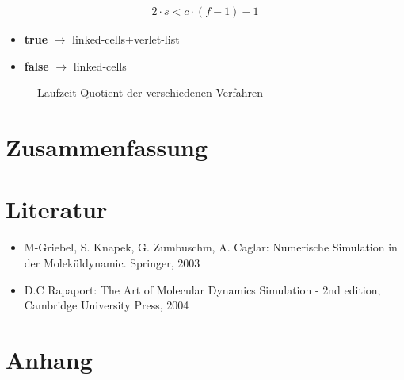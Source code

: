 \documentclass[
	12pt,
	a4paper,
	BCOR10mm,
	DIV14,
	headsepline,
]{scrreprt}
\begin{document}
\begin{align*}
	2\cdot s < c \cdot (f - 1) - 1
\end{align*}

\begin{itemize}
	\item \textbf{true} $\rightarrow$ linked-cells+verlet-list
	\item \textbf{false} $\rightarrow$ linked-cells
\end{itemize}
\begin{figure}[h]
		\centering
			\caption{Laufzeit-Quotient der verschiedenen Verfahren}
	\label{figure:OpenMPSpeedup}
	\end{figure}
\chapter{Zusammenfassung}
\label{Zusammenfassung}


\chapter{Literatur}
\label{Literatur}

\begin{itemize}
	\item M-Griebel, S. Knapek, G. Zumbuschm, A. Caglar: Numerische Simulation in der Moleküldynamic. Springer, 2003
	\item D.C Rapaport: The Art of Molecular Dynamics Simulation - 2nd edition, Cambridge University Press, 2004
\end{itemize}

\chapter{Anhang}
\label{Anhang}
\end{document}
